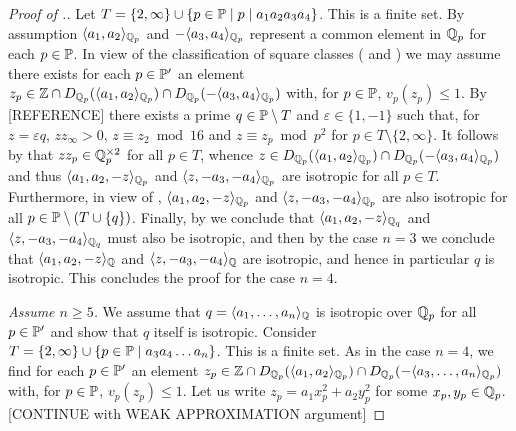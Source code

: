 \documentclass[12pt, leqno, british]{amsart}
\begin{document}
\begin{proof}[Proof of .]
Let $T = \lbrace 2, \infty \rbrace \cup \lbrace p \in \mathbb P \mid p\mid a_1a_2a_3a_4 \rbrace$.
This is a finite set.
By assumption $\langle a_1, a_2 \rangle_{\mathbb Q_p}$ and $-\langle a_3, a_4 \rangle_{\mathbb Q_p}$ represent a common element in $\mathbb Q_p$ for each $p \in \mathbb P$.
In view of the classification of square classes ( and ) we may assume there exists for each $p \in \mathbb P'$ an element $z_p \in \mathbb Z \cap D_{\mathbb Q_p}(\langle a_1, a_2 \rangle_{\mathbb Q_p}) \cap D_{\mathbb Q_p}(-\langle a_3, a_4 \rangle_{\mathbb Q_p})$ with, for $p \in \mathbb P$, $v_p(z_p) \leq 1$.
By [REFERENCE] there exists a prime $q \in \mathbb P \setminus T$ and $\varepsilon \in \lbrace 1, -1 \rbrace$ such that, for $z = \varepsilon q$, $z z_\infty > 0$, $z \equiv z_2 \bmod 16$ and $z \equiv z_p \bmod p^2$ for $p \in T \setminus \lbrace 2, \infty \rbrace$.
It follows by  that $z z_p \in \mathbb Q_p^{\times 2}$ for all $p \in T$, whence $z \in  D_{\mathbb Q_p}(\langle a_1, a_2 \rangle_{\mathbb Q_p}) \cap D_{\mathbb Q_p}(-\langle a_3, a_4 \rangle_{\mathbb Q_p})$ and thus $\langle a_1, a_2, -z \rangle_{\mathbb Q_p}$ and $\langle z, -a_3, -a_4 \rangle_{\mathbb Q_p}$ are isotropic for all $p \in T$.
Furthermore, in view of , $\langle a_1, a_2, -z \rangle_{\mathbb Q_p}$ and $\langle z, -a_3, -a_4 \rangle_{\mathbb Q_p}$ are also isotropic for all $p \in \mathbb P \setminus (T \cup \lbrace q \rbrace)$.
Finally, by  we conclude that $\langle a_1, a_2, -z \rangle_{\mathbb Q_q}$ and $\langle z, -a_3, -a_4 \rangle_{\mathbb Q_q}$ must also be isotropic, and then by the case $n = 3$ we conclude that $\langle a_1, a_2, -z \rangle_{\mathbb Q}$ and $\langle z, -a_3, -a_4 \rangle_{\mathbb Q}$ are isotropic, and hence in particular $q$ is isotropic.
This concludes the proof for the case $n = 4$.

\emph{Assume $n \geq 5$.}
We assume that $q = \langle a_1, \ldots, a_n \rangle_{\mathbb Q}$ is isotropic over $\mathbb Q_p$ for all $p \in \mathbb P'$ and show that $q$ itself is isotropic.
Consider $T = \lbrace 2, \infty \rbrace \cup \lbrace p \in \mathbb P \mid a_3a_4\ldots a_n \rbrace$.
This is a finite set.
As in the case $n = 4$, we find for each $p \in \mathbb P'$ an element $z_p \in \mathbb Z \cap D_{\mathbb Q_p}(\langle a_1, a_2 \rangle_{\mathbb Q_p}) \cap D_{\mathbb Q_p}(-\langle a_3, \ldots, a_n \rangle_{\mathbb Q_p})$ with, for $p \in \mathbb P$, $v_p(z_p) \leq 1$.
Let us write $z_p = a_1x_p^2 + a_2y_p^2$ for some $x_p, y_p \in \mathbb Q_p$.
[CONTINUE with WEAK APPROXIMATION argument]
\end{proof}
\end{document}
